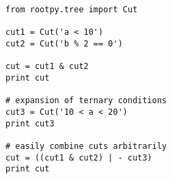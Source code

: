\begin{footnotesize}
\begin{verbatim}
from rootpy.tree import Cut

cut1 = Cut('a < 10')
cut2 = Cut('b % 2 == 0')

cut = cut1 & cut2
print cut

# expansion of ternary conditions
cut3 = Cut('10 < a < 20')
print cut3

# easily combine cuts arbitrarily
cut = ((cut1 & cut2) | - cut3)
print cut
\end{verbatim}
\end{footnotesize}
